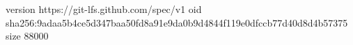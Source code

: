 version https://git-lfs.github.com/spec/v1
oid sha256:9adaa5b4ce5d347baa50fd8a91e9da0b9d4844f119e0dfccb77d40d8d4b57375
size 88000

